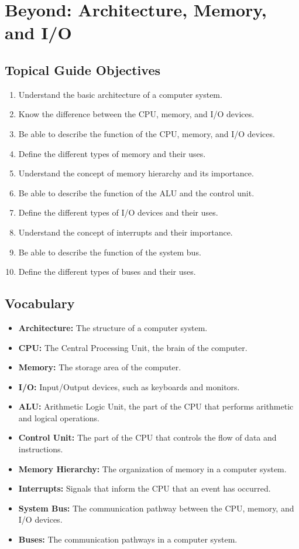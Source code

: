 \documentclass[12pt]{article}
\begin{document}
\section{Beyond: Architecture, Memory, and I/O}
\subsection{Topical Guide Objectives}
\begin{enumerate}
	\item Understand the basic architecture of a computer system.
	\item Know the difference between the CPU, memory, and I/O devices.
	\item Be able to describe the function of the CPU, memory, and I/O devices.
	\item Define the different types of memory and their uses.
	\item Understand the concept of memory hierarchy and its importance.
	\item Be able to describe the function of the ALU and the control unit.
	\item Define the different types of I/O devices and their uses.
	\item Understand the concept of interrupts and their importance.
	\item Be able to describe the function of the system bus.
	\item Define the different types of buses and their uses.
\end{enumerate}
\subsection{Vocabulary}
\begin{itemize}
	\item \textbf{Architecture:} The structure of a computer system.
	\item \textbf{CPU:} The Central Processing Unit, the brain of the computer.
	\item \textbf{Memory:} The storage area of the computer.
	\item \textbf{I/O:} Input/Output devices, such as keyboards and monitors.
	\item \textbf{ALU:} Arithmetic Logic Unit, the part of the CPU that performs
	      arithmetic and logical operations.
	\item \textbf{Control Unit:} The part of the CPU that controls the flow of
	      data and instructions.
	\item \textbf{Memory Hierarchy:} The organization of memory in a computer
	      system.
	\item \textbf{Interrupts:} Signals that inform the CPU that an event has
	      occurred.
	\item \textbf{System Bus:} The communication pathway between the CPU,
	      memory, and I/O devices.
	\item \textbf{Buses:} The communication pathways in a computer system.
\end{itemize}
\end{document}
